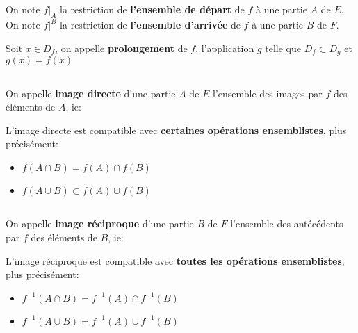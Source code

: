 \subsection*{}

On note \(f|_A\) la restriction de \textbf{l'ensemble de départ} de \(f\) à une partie \(A\) de \(E\).\+
On note \(f|^B\) la restriction de \textbf{l'ensemble d'arrivée} de \(f\) à une partie \(B\) de \(F\).\<

Soit \(x \in D_f\), on appelle \textbf{prolongement} de \(f\), l'application \(g\) telle que \(D_f \subset D_g\) et \(g(x) = f(x)\)

\subsection*{}

On appelle \textbf{image directe} d'une partie \(A\) de \(E\) l'ensemble des images par \(f\) des éléments de \(A\), ie:

L'image directe est compatible avec \textbf{certaines opérations ensemblistes}, plus précisément:
\begin{multicols}{2}
    \begin{itemize}
        \item \(f(A \cap B) = f(A) \cap f(B)\)
        \item \(f(A \cup B) \subset f(A) \cup f(B)\)
    \end{itemize}
\end{multicols}

\subsection*{}
On appelle \textbf{image réciproque} d'une partie \(B\) de \(F\) l'ensemble des antécédents par \(f\) des éléments de \(B\), ie:

L'image réciproque est compatible avec \textbf{toutes les opérations ensemblistes}, plus précisément:
\begin{multicols}{2}
    \begin{itemize}
        \item \(f^{-1}(A \cap B) = f^{-1}(A) \cap f^{-1}(B)\)
        \item \(f^{-1}(A \cup B) = f^{-1}(A) \cup f^{-1}(B)\)
    \end{itemize}
\end{multicols}

